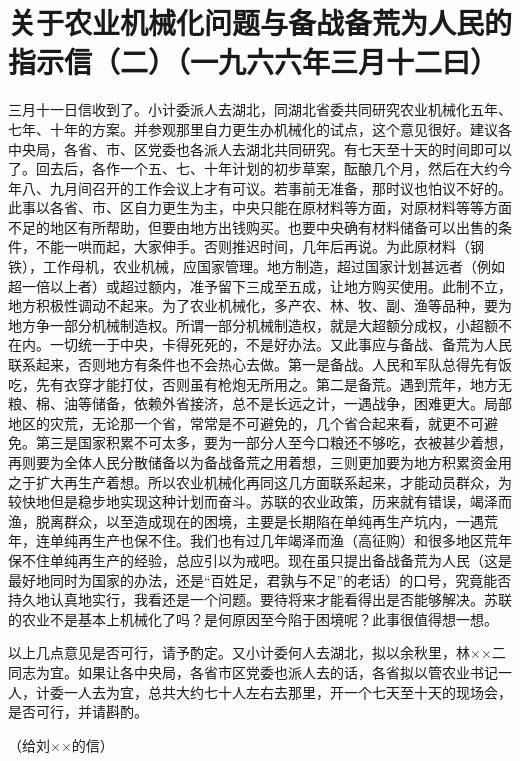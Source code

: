 \section[关于农业机械化问题与备战备荒为人民的指示信（二）（一九六六年三月十二曰）]{关于农业机械化问题与备战备荒为人民的指示信（二）（一九六六年三月十二曰）}


三月十一日信收到了。小计委派人去湖北，同湖北省委共同研究农业机械化五年、七年、十年的方案。并参观那里自力更生办机械化的试点，这个意见很好。建议各中央局，各省、市、区党委也各派人去湖北共同研究。有七天至十天的时间即可以了。回去后，各作一个五、七、十年计划的初步草案，酝酿几个月，然后在大约今年八、九月间召开的工作会议上才有可议。若事前无准备，那时议也怕议不好的。此事以各省、市、区自力更生为主，中央只能在原材料等方面，对原材料等等方面不足的地区有所帮助，但要由地方出钱购买。也要中央确有材料储备可以出售的条件，不能一哄而起，大家伸手。否则推迟时间，几年后再说。为此原材料（钢铁），工作母机，农业机械，应国家管理。地方制造，超过国家计划甚远者（例如超一倍以上者）或超过额内，准予留下三成至五成，让地方购买使用。此制不立，地方积极性调动不起来。为了农业机械化，多产农、林、牧、副、渔等品种，要为地方争一部分机械制造权。所谓一部分机械制造权，就是大超额分成权，小超额不在内。一切统一于中央，卡得死死的，不是好办法。又此事应与备战、备荒为人民联系起来，否则地方有条件也不会热心去做。第一是备战。人民和军队总得先有饭吃，先有衣穿才能打仗，否则虽有枪炮无所用之。第二是备荒。遇到荒年，地方无粮、棉、油等储备，依赖外省接济，总不是长远之计，一遇战争，困难更大。局部地区的灾荒，无论那一个省，常常是不可避免的，几个省合起来看，就更不可避免。第三是国家积累不可太多，要为一部分人至今口粮还不够吃，衣被甚少着想，再则要为全体人民分散储备以为备战备荒之用着想，三则更加要为地方积累资金用之于扩大再生产着想。所以农业机械化再同这几方面联系起来，才能动员群众，为较快地但是稳步地实现这种计划而奋斗。苏联的农业政策，历来就有错误，竭泽而渔，脱离群众，以至造成现在的困境，主要是长期陷在单纯再生产坑内，一遇荒年，连单纯再生产也保不住。我们也有过几年竭泽而渔（高征购）和很多地区荒年保不住单纯再生产的经验，总应引以为戒吧。现在虽只提出备战备荒为人民（这是最好地同时为国家的办法，还是“百姓足，君孰与不足”的老话）的口号，究竟能否持久地认真地实行，我看还是一个问题。要待将来才能看得出是否能够解决。苏联的农业不是基本上机械化了吗？是何原因至今陷于困境呢？此事很值得想一想。

以上几点意见是否可行，请予酌定。又小计委何人去湖北，拟以余秋里，林××二同志为宜。如果让各中央局，各省市区党委也派人去的话，各省拟以管农业书记一人，计委一人去为宜，总共大约七十人左右去那里，开一个七天至十天的现场会，是否可行，并请斟酌。

（给刘××的信）

